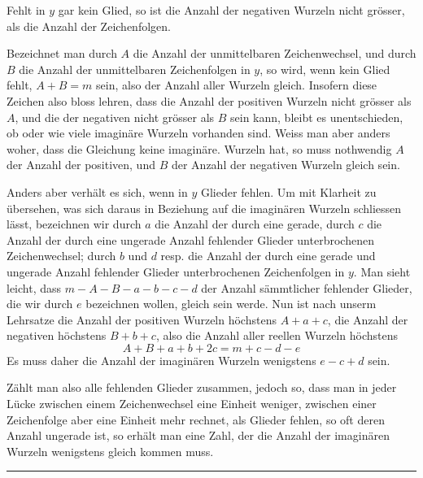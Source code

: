 Fehlt in $y$ gar kein Glied, so ist die Anzahl der negativen Wurzeln
nicht grösser, als die Anzahl der Zeichenfolgen.

Bezeichnet man durch $A$ die Anzahl der unmittelbaren Zeichenwechsel,
und durch $B$ die Anzahl der unmittelbaren Zeichenfolgen in $y$, so
wird, wenn kein Glied fehlt, $A+B=m$ sein, also der Anzahl aller
Wurzeln gleich. Insofern diese Zeichen also bloss lehren, dass die
Anzahl der positiven Wurzeln nicht grösser als $A$, und die der
negativen nicht grösser als $B$ sein kann, bleibt es unentschieden,
ob oder wie viele imaginäre Wurzeln vorhanden sind. Weiss man aber
anders woher, dass die Gleichung keine imaginäre. Wurzeln hat, so
muss nothwendig $A$ der Anzahl der positiven, und $B$ der Anzahl der
negativen Wurzeln gleich sein.

Anders aber verhält es sich, wenn in $y$ Glieder fehlen. Um mit Klarheit
zu übersehen, was sich daraus in Beziehung auf die imaginären
Wurzeln schliessen lässt, bezeichnen wir durch $a$ die Anzahl der
durch eine gerade, durch $c$ die Anzahl der durch eine ungerade Anzahl
fehlender Glieder unterbrochenen Zeichenwechsel; durch $b$ und $d$
resp. die Anzahl der durch eine gerade und ungerade Anzahl fehlender
Glieder unterbrochenen Zeichenfolgen in $y$. Man sieht leicht, dass
$m-A-B-a-b-c-d$ der Anzahl sämmtlicher fehlender Glieder, die wir
durch $e$ bezeichnen wollen, gleich sein werde. Nun ist nach unserm
Lehrsatze die Anzahl der positiven Wurzeln höchstens $A+a+c$, die
Anzahl der negativen höchstens $B+b+c$, also die Anzahl aller
reellen Wurzeln höchstens
\[
A+B+a+b+2c=m+c-d-e
\]
Es muss daher die Anzahl der imaginären Wurzeln wenigstens $e-c+d$ sein.

Zählt man also alle fehlenden Glieder zusammen, jedoch so, dass man
in jeder Lücke zwischen einem Zeichenwechsel eine Einheit weniger,
zwischen einer Zeichenfolge aber eine Einheit mehr rechnet, als Glieder
fehlen, so oft deren Anzahl ungerade ist, so erhält man eine Zahl,
der die Anzahl der imaginären Wurzeln wenigstens gleich kommen muss.
\begin{center}\rule{0.28\linewidth}{0.4pt}\end{center}
